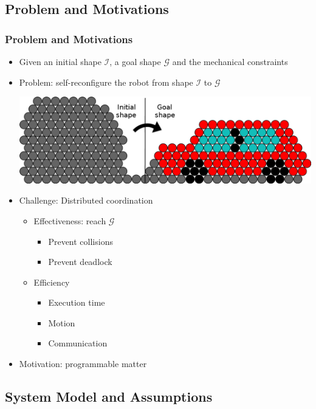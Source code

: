 \subsection{Problem and Motivations}

\begin{frame} \frametitle{Problem and Motivations}

\begin{itemize}
\item Given an initial shape $\mathcal{I}$, a goal shape $\mathcal{G}$ and the mechanical constraints
\item Problem: self-reconfigure the robot from shape $\mathcal{I}$ to $\mathcal{G}$
\begin{center}
	\includegraphics[width=0.6\linewidth]{fig/reconfiguration/car.png}
\end{center}
\item Challenge: Distributed coordination
\begin{itemize}
	\item Effectiveness: reach $\mathcal{G}$
	\begin{itemize}
		\item Prevent collisions
		\item Prevent deadlock %
	\end{itemize}
	\item Efficiency
	\begin{itemize}
		\item Execution time	
		\item Motion
		\item Communication	
	\end{itemize}
\end{itemize}
\item Motivation: programmable matter
\end{itemize}

\end{frame}

\subsection{System Model and Assumptions}

